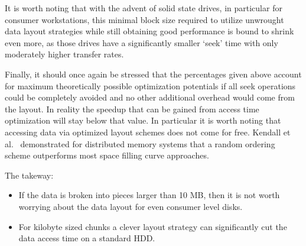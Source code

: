 
It is worth noting that with the advent of solid state drives, in
particular for consumer workstations, this minimal block size required
to utilize unwrought data layout strategies while still obtaining
good performance is bound to shrink even more, as those drives have a
significantly smaller `seek' time with only moderately higher transfer
rates.

Finally, it should once again be stressed that the percentages
given above account for maximum theoretically possible optimization
potentials if all seek operations could be completely avoided and no
other additional overhead would come from the layout.  In reality the
speedup that can be gained from access time optimization will stay
below that value. In particular it is worth noting that accessing data
via optimized layout schemes does not come
for free. Kendall et al.~\cite{Kendall:2009:TDO} demonstrated for
distributed memory systems that a random ordering scheme outperforms
most space filling curve approaches.

The takeway:

\begin{itemize}
  \item If the data is broken into pieces larger than 10 MB, then it
  is not worth worrying about the data layout for even consumer level
  disks.
  \item For kilobyte sized chunks a clever layout strategy can
           significantly cut the data access time on a standard HDD.
\end{itemize}

% 

